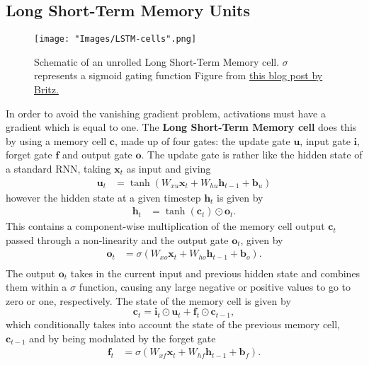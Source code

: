\documentclass[]{article}
\begin{document}
\subsection{Long Short-Term Memory Units}
\begin{figure}	\centering
	\texttt{[image: "Images/LSTM-cells".png]}
	\caption{Schematic of an unrolled Long Short-Term Memory cell. $\sigma$ represents a sigmoid gating function Figure from \href{http://www.wildml.com/2016/04/deep-learning-for-chatbots-part-1-introduction/}{this blog post by Britz.}}
	\label{fig:encoder-decoder}
\end{figure}
In order to avoid the vanishing gradient problem, activations must have a gradient which is equal to one. The \textbf{Long Short-Term Memory cell} does this by using a memory cell $\textbf{c}$, made up of four gates: the update gate $\textbf{u}$, input gate $\textbf{i}$, forget gate $\textbf{f}$ and output gate $\textbf{o}$. The update gate is rather like the hidden state of a standard RNN, taking $\textbf{x}_t$ as input and giving
\begin{align}
\textbf{u}_t&=\tanh(W_{xu}\textbf{x}_t+W_{hu}\textbf{h}_{t-1}+\textbf{b}_u)
\end{align}
however the hidden state at a given timestep $\textbf{h}_{t}$ is given by
\begin{align}
\label{eq:hiddenLSTM}
\textbf{h}_{t}&= \tanh(\textbf{c}_t) \odot \textbf{o}_t.
\end{align}
This contains a component-wise multiplication of the memory cell output $\textbf{c}_t$ passed through a non-linearity and the output gate $\textbf{o}_t$, given by
\begin{align}
\textbf{o}_{t}&=\sigma(W_{xo}\textbf{x}_t+W_{ho}\textbf{h}_{t-1}+\textbf{b}_o).\\
\end{align}
The output $\textbf{o}_t$ takes in the current input and previous hidden state and combines them within a $\sigma$ function, causing any large negative or positive values to go to zero or one, respectively. The state of the memory cell is given by
\begin{equation}
	\textbf{c}_{t}=\textbf{i}_t\odot \textbf{u}_t + \textbf{f}_t\odot\textbf{c}_{t-1},
\end{equation}
which conditionally takes into account the state of the previous memory cell, $\textbf{c}_{t-1}$ and by being modulated by the forget gate
\begin{align}
\textbf{f}_{t}&=\sigma(W_{xf}\textbf{x}_t+W_{hf}\textbf{h}_{t-1}+\textbf{b}_f).
\end{align}
\end{document}
